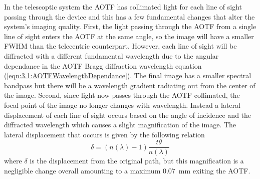 \documentclass[12pt]{article}
\begin{document}

In the telescoptic system the AOTF has collimated light for each line of sight passing through the device and this has a few fundamental changes that alter the system's imaging quality. First, the light passing through the AOTF from a single line of sight enters the AOTF at the same angle, so the image will have a smaller FWHM than the telecentric counterpart. However, each line of sight will be diffracted with a different fundamental wavelength due to the angular dependance in the AOTF Bragg diffraction wavelength equation (\autoref{eqn:3.1:AOTFWavelengthDependance}). The final image has a smaller spectral bandpass but there will be a wavelength gradient radiating out from the center of the image. Second, since light now passes through the AOTF collimated, the focal point of the image no longer changes with wavelength. Instead a lateral displacement of each line of sight occurs based on the angle of incidence and the diffracted wavelength which causes a slight magnification of the image. The lateral displacement that occurs is given by the following relation
\begin{equation}
    \delta = (n(\lambda)-1)\frac{t\theta}{n(\lambda)}
    \label{eqn:3.2:planeParallelDiplacement}
\end{equation}
where $\delta$ is the displacement from the original path, but this magnification is a negligible change overall amounting to a maximum 0.07~mm exiting the AOTF.

\end{document}
